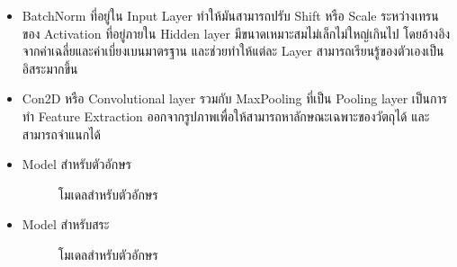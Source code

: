 \documentclass[12pt,oneside,openright,a4paper]{cpe-thai-project}
\begin{document}
\begin{itemize}
  \item BatchNorm ที่อยู่ใน Input Layer ทำให้มันสามารถปรับ Shift หรือ Scale ระหว่างเทรน ของ Activation  
  ที่อยู่ภายใน Hidden layer มีขนาดเหมาะสมไม่เล็กไม่ใหญ่เกินไป โดยอ้างอิงจากค่าเฉลี่ยและค่าเบี่ยงเบนมาตรฐาน และช่วยทำให้แต่ละ Layer สามารถเรียนรู้ของตัวเองเป็นอิสระมากขึ้น
  \item Con2D หรือ Convolutional layer รวมกับ MaxPooling ที่เป็น Pooling layer เป็นการทำ Feature Extraction ออกจากรูปภาพเพื่อให้สามารถหาลักษณะเฉพาะของวัตถุได้ และสามารถจำแนกได้
  \newpage
  \item Model สำหรับตัวอักษร 
  \begin{figure}[!ht]\centering
    \setlength{\fboxrule}{0.2mm} %
    \setlength{\fboxsep}{1cm}
    \caption{โมเดลสำหรับตัวอักษร}\label{fig:modelarchitecture}
   \end{figure}
 
  \item Model สำหรับสระ
  \begin{figure}[!ht]\centering
    \setlength{\fboxrule}{0.2mm} %
    \setlength{\fboxsep}{1cm}
    \caption{โมเดลสำหรับตัวอักษร}\label{fig:modelarchitecturevowel}
   \end{figure}
  \end{itemize}
\newpage
\end{document}
